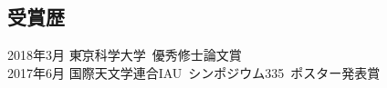 \documentclass[]{res}
\begin{document}
\begin{resume}
\section{受賞歴}
\noindent
\begin{tabbing}
    2018年3月  \hspace{2mm} \=東京科学大学~優秀修士論文賞\\
    2017年6月  \hspace{2mm} \>国際天文学連合IAU~シンポジウム335~ポスター発表賞
\end{tabbing}

%
%
%
%
%
%

\end{resume}
\end{document}
